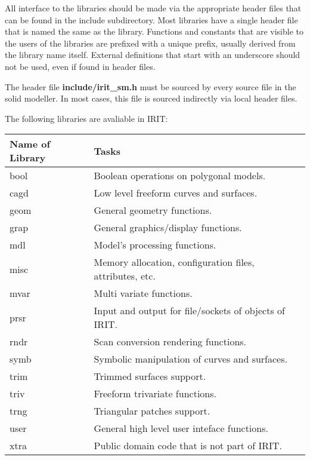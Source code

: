 All interface to the libraries should be made via the appropriate header
files that can be found in the include subdirectory. Most libraries
have a single header file that is named the same as the library.
Functions and constants that are visible to the users of the libraries
are prefixed with a unique prefix, usually derived from the library
name itself. External definitions that start with an underscore should
not be used, even if found in header files.

The header file {\bf include/irit\_sm.h} must be sourced by every
source file in the solid modeller. In most cases, this file is sourced
indirectly via local header files.

The following libraries are avaliable in IRIT:
\begin{center}
\begin{tabular}{|l|l|} \hline
    Name of Library & Tasks \\ \hline
    bool & Boolean operations on polygonal models. \\
    cagd & Low level freeform curves and surfaces. \\
    geom & General geometry functions. \\
    grap & General graphics/display functions. \\
    mdl  & Model's processing functions. \\
    misc & Memory allocation, configuration files, attributes, etc. \\
    mvar & Multi variate functions. \\
    prsr & Input and output for file/sockets of objects of IRIT. \\
    rndr & Scan conversion rendering functions. \\
    symb & Symbolic manipulation of curves and surfaces. \\
    trim & Trimmed surfaces support. \\
    triv & Freeform trivariate functions. \\
    trng & Triangular patches support. \\
    user & General high level user inteface functions. \\
    xtra & Public domain code that is not part of IRIT. \\ \hline
\end{tabular}
\end{center}



